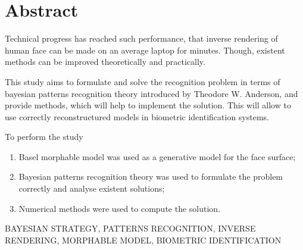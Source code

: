 \chapter*{Abstract}

Technical progress has reached such performance,
that inverse rendering of human face can be made on an average laptop
for minutes.
Though,
existent methods can be improved theoretically and practically.

This study aims to formulate and solve the recognition problem
in terms of bayesian patterns recognition theory
introduced by Theodore W. Anderson,
and provide methods, which will help to implement the solution.
This will allow to use correctly reconstructured models
in biometric identification systems.

To perform the study
\begin{enumerate}
  \item
    Basel morphable model was used as a generative model for the face surface;
  \item
    Bayesian patterns recognition theory was used
    to formulate the problem correctly and analyse existent solutions;
  \item
    Numerical methods were used to compute the solution.
\end{enumerate}

\MakeUppercase{bayesian strategy, patterns recognition,
 inverse rendering, morphable model,
biometric identification}
